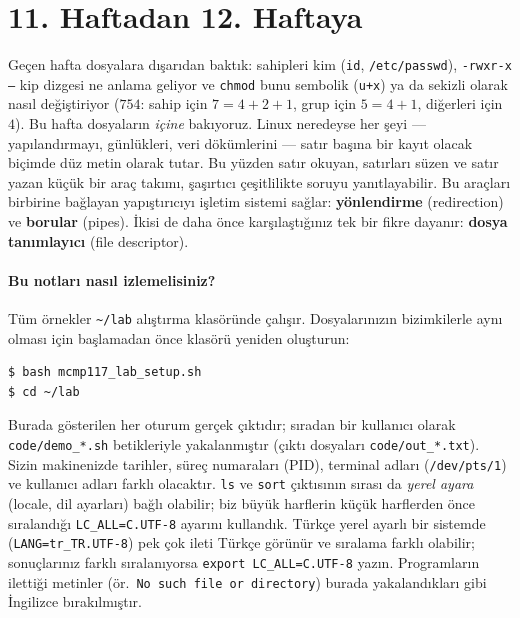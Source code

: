 \documentclass[11pt,a4paper]{article}
\newcommand{\term}[1]{\textbf{\color{mintdeep}#1}}
\newcommand{\cmd}[1]{\texttt{#1}}
\begin{document}
\setcounter{tocdepth}{1}
\tableofcontents

\section{11. Haftadan 12. Haftaya}

Geçen hafta dosyalara dışarıdan baktık: sahipleri kim (\cmd{id}, \texttt{/etc/passwd}), \texttt{-rwxr-x---} kip dizgesi ne anlama geliyor ve \cmd{chmod} bunu sembolik (\cmd{u+x}) ya da sekizli olarak nasıl değiştiriyor ($754$: sahip için $7 = 4+2+1$, grup için $5 = 4+1$, diğerleri için $4$). Bu hafta dosyaların \emph{içine} bakıyoruz. Linux neredeyse her şeyi --- yapılandırmayı, günlükleri, veri dökümlerini --- satır başına bir kayıt olacak biçimde düz metin olarak tutar. Bu yüzden satır okuyan, satırları süzen ve satır yazan küçük bir araç takımı, şaşırtıcı çeşitlilikte soruyu yanıtlayabilir. Bu araçları birbirine bağlayan yapıştırıcıyı işletim sistemi sağlar: \term{yönlendirme} (redirection) ve \term{borular} (pipes). İkisi de daha önce karşılaştığınız tek bir fikre dayanır: \term{dosya tanımlayıcı} (file descriptor).

\paragraph{Bu notları nasıl izlemelisiniz?} Tüm örnekler \texttt{\textasciitilde/lab} alıştırma klasöründe çalışır. Dosyalarınızın bizimkilerle aynı olması için başlamadan önce klasörü yeniden oluşturun:
\begin{lstlisting}[style=term]
$ bash mcmp117_lab_setup.sh
$ cd ~/lab
\end{lstlisting}
Burada gösterilen her oturum gerçek çıktıdır; sıradan bir kullanıcı olarak \texttt{code/demo\_*.sh} betikleriyle yakalanmıştır (çıktı dosyaları \texttt{code/out\_*.txt}). Sizin makinenizde tarihler, süreç numaraları (PID), terminal adları (\texttt{/dev/pts/1}) ve kullanıcı adları farklı olacaktır. \cmd{ls} ve \cmd{sort} çıktısının sırası da \emph{yerel ayara} (locale, dil ayarları) bağlı olabilir; biz büyük harflerin küçük harflerden önce sıralandığı \cmd{LC\_ALL=C.UTF-8} ayarını kullandık. Türkçe yerel ayarlı bir sistemde (\cmd{LANG=tr\_TR.UTF-8}) pek çok ileti Türkçe görünür ve sıralama farklı olabilir; sonuçlarınız farklı sıralanıyorsa \cmd{export LC\_ALL=C.UTF-8} yazın. Programların ilettiği metinler (ör.\ \texttt{No such file or directory}) burada yakalandıkları gibi İngilizce bırakılmıştır.
\end{document}
